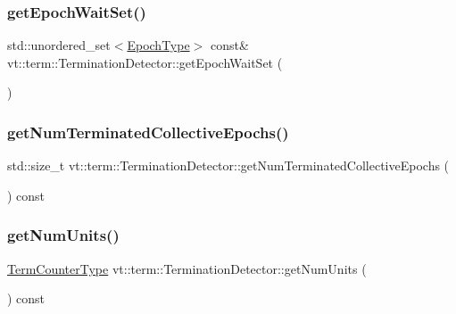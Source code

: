 \subsubsection{\texorpdfstring{get\+Epoch\+Wait\+Set()}{getEpochWaitSet()}}
{\footnotesize\ttfamily std\+::unordered\+\_\+set$<$\hyperlink{namespacevt_a985a5adf291c34a3ca263b3378388236}{Epoch\+Type}$>$ const\& vt\+::term\+::\+Termination\+Detector\+::get\+Epoch\+Wait\+Set (\begin{DoxyParamCaption}{ }\end{DoxyParamCaption})\hspace{0.3cm}{\ttfamily [inline]}}

\mbox{\label{structvt_1_1term_1_1_termination_detector_af0b08c4a5dd17d893e677ad280bef84a}} 
\subsubsection{\texorpdfstring{get\+Num\+Terminated\+Collective\+Epochs()}{getNumTerminatedCollectiveEpochs()}}
{\footnotesize\ttfamily std\+::size\+\_\+t vt\+::term\+::\+Termination\+Detector\+::get\+Num\+Terminated\+Collective\+Epochs (\begin{DoxyParamCaption}{ }\end{DoxyParamCaption}) const}

\mbox{\label{structvt_1_1term_1_1_termination_detector_aa5802cb6f199f3359b1a85058102220c}} 
\subsubsection{\texorpdfstring{get\+Num\+Units()}{getNumUnits()}}
{\footnotesize\ttfamily \hyperlink{namespacevt_1_1term_a4fd378cdb0c36683afc1b3399d685f7f}{Term\+Counter\+Type} vt\+::term\+::\+Termination\+Detector\+::get\+Num\+Units (\begin{DoxyParamCaption}{ }\end{DoxyParamCaption}) const}

